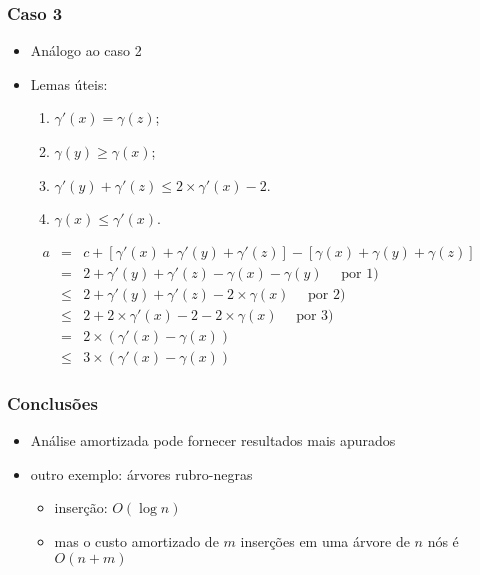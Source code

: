 \documentclass{beamer}
\begin{document}
\begin{frame}

\frametitle{Caso 3}

\begin{itemize}
\item Análogo ao caso 2
\item Lemas úteis:
\begin{enumerate}
\item $\gamma'(x) = \gamma(z)$;
\item $\gamma(y) \ge \gamma(x)$;
\item $\gamma'(y)+\gamma'(z) \le 2 \times \gamma'(x) - 2$.
\item $\gamma(x) \le \gamma'(x)$.
\end{enumerate}
\end{itemize}

\begin{eqnarray*}
a & = & c + [\gamma'(x)+\gamma'(y)+\gamma'(z)] - [\gamma(x)+\gamma(y)+\gamma(z)]\\
& = & 2 + \gamma'(y)+\gamma'(z)-\gamma(x)-\gamma(y) \quad \mbox{ por 1)}\\
& \le & 2 + \gamma'(y)+\gamma'(z) - 2 \times \gamma(x) \quad \mbox{ por 2)}\\
& \le & 2 + 2 \times \gamma'(x) - 2 - 2 \times \gamma(x) \quad \mbox{ por 3)}\\
& = & 2 \times (\gamma'(x) - \gamma(x)) \\
& \le & 3 \times (\gamma'(x) - \gamma(x))
\end{eqnarray*}

\end{frame}

\begin{frame}

\frametitle{Conclusões}

\begin{itemize}
\item Análise amortizada pode fornecer resultados mais apurados
\item outro exemplo: árvores rubro-negras
\begin{itemize}
\item inserção: $O(\log n)$
\item mas o custo amortizado de $m$ inserções em uma árvore de $n$ nós
  é $O(n+m)$
\end{itemize}
\end{itemize}

\end{frame}
\end{document}
